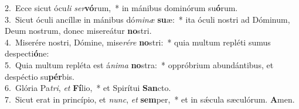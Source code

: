 {2.~}Ecce sicut ócu\textit{li} \textit{ser}\textbf{vó}rum,~* in mánibus dominórum su\textbf{ó}rum.\\
{3.~}Sicut óculi ancíllæ in mánibus dó\textit{mi}\textit{næ} \textbf{su}æ:~* ita óculi nostri ad Dóminum, Deum nostrum, donec misereátur \textbf{no}stri.\\
{4.~}Miserére nostri, Dómine, mise\textit{ré}\textit{re} \textbf{no}stri:~* quia multum repléti sumus despecti\textbf{ó}ne:\\
{5.~}Quia multum repléta est á\textit{ni}\textit{ma} \textbf{no}stra:~* oppróbrium abundántibus, et despéctio su\textbf{pér}bis.\\
{6.~}Glória Pa\textit{tri}, \textit{et} \textbf{Fí}lio,~* et Spirítui \textbf{San}cto.\\
{7.~}Sicut erat in princípio, et \textit{nunc}, \textit{et} \textbf{sem}per,~* et in sǽcula sæculórum. \textbf{A}men.\\
